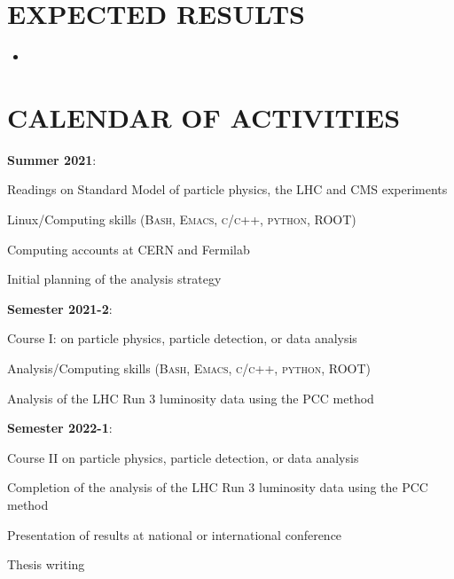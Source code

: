 \documentclass[final,12pt]{article}
\newcommand{\SubItem}[1]{ {\setlength\itemindent{15pt} \item[-] #1} }
\begin{document}
\section{EXPECTED RESULTS}

\begin{itemize}
\item 

\end{itemize}

\section{CALENDAR OF ACTIVITIES}

\begin{itemize}

\item {\bf Summer 2021}:
  \SubItem{ Readings on Standard Model of particle physics,  the LHC and CMS experiments}
  \SubItem{ Linux/Computing skills (\textsc{Bash, Emacs, c/c++, python, ROOT})}
  \SubItem{ Computing accounts at CERN and Fermilab}
  \SubItem{ Initial planning of the analysis strategy}

\item {\bf Semester 2021-2}:
  \SubItem{ Course I: on particle physics, particle detection, or data analysis}
  \SubItem{ Analysis/Computing skills (\textsc{Bash, Emacs, c/c++, python, ROOT})}
  \SubItem{ Analysis of the LHC Run 3 luminosity data using the PCC method}

\item {\bf Semester 2022-1}:
  \SubItem{ Course II on particle physics, particle detection, or  data analysis}
  \SubItem{ Completion of the analysis of the LHC Run 3 luminosity data using the PCC method}
  \SubItem{ Presentation of results at national or international conference}
  \SubItem{ Thesis writing}

  
\end{itemize}


\onehalfspacing


\end{document}
